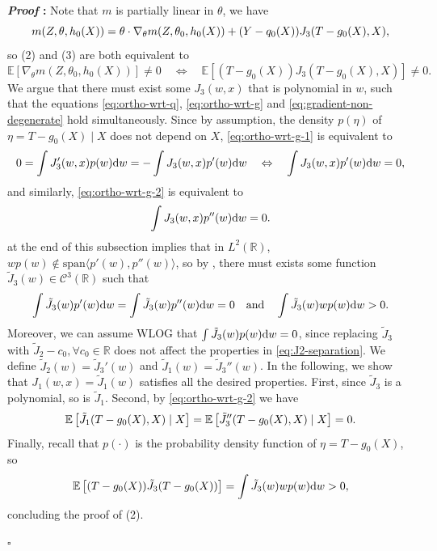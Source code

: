 \documentclass{article}
\def\gC{{\mathcal{C}}}
\newcommand{\E}{\mathbb{E}}
\newcommand{\R}{\mathbb{R}}
\newcommand{\dd}{\textup{d}}
\renewenvironment{proof}{\noindent\textbf{\textit{Proof }:}}{\hfill$\square$}
\begin{document}
\begin{proof}
Note that $m$ is partially linear in $\theta$, we have
\begin{equation}
    \notag
    m(Z,\theta,h_0(X)) = \theta\cdot\nabla_{\theta} m(Z,\theta_0,h_0(X)) + (Y-q_0(X))J_3(T-g_0(X),X),
\end{equation}
so (2) and (3) are both equivalent to
\begin{equation}
    \label{eq:gradient-non-degenerate}
    \E\left[ \nabla_{\theta} m(Z,\theta_0,h_0(X)) \right] \neq 0 \quad \Leftrightarrow \quad \E\left[ (T-g_0(X))J_3(T-g_0(X),X) \right] \neq 0.
\end{equation}
We argue that there must exist some $J_3(w,x)$ that is polynomial in $w$, such that the equations \eqref{eq:ortho-wrt-q}, \eqref{eq:ortho-wrt-g} and \eqref{eq:gradient-non-degenerate} hold simultaneously. Since by assumption, the density $p(\eta)$ of $\eta=T-g_0(X)\mid X$ does not depend on $X$, \eqref{eq:ortho-wrt-g-1} is equivalent to
\begin{equation}
    \notag
    0 = \int J_3'(w,x) p(w) \dd w = - \int J_3(w,x) p'(w) \dd w \quad \Leftrightarrow \quad \int J_3(w,x) p'(w) \dd w = 0,
\end{equation}
and similarly, \eqref{eq:ortho-wrt-g-2} is equivalent to
\begin{equation}
    \notag
    \int J_3(w,x) p''(w) \dd w = 0.
\end{equation}
  at the end of this subsection implies that in $L^2(\R)$, $wp(w)\notin\mathrm{span}\langle p'(w),p''(w)\rangle$, so by  , there must exists some function $\tilde{J}_3(w)\in\gC^3(\R)$ such that
\begin{equation}
    \label{eq:J2-separation}
    \int \tilde{J}_3(w) p'(w) \dd w = \int \tilde{J}_3(w) p''(w) \dd w = 0 \quad \text{and} \quad \int \tilde{J}_3(w)wp(w)\dd w  > 0.
\end{equation}
Moreover, we can assume WLOG that $\int \tilde{J}_3(w)p(w)\dd w = 0$, since replacing $\tilde{J}_3$ with $\tilde{J}_2-c_0, \forall c_0\in\R$ does not affect the properties in \eqref{eq:J2-separation}. We define $\tilde{J}_2(w)=\tilde{J}_3'(w)$ and $\tilde{J}_1(w)=\tilde{J}_3''(w)$. In the following, we show that $J_1(w,x)=\tilde{J}_1(w)$ satisfies all the desired properties. First, since $\tilde{J}_3$ is a polynomial, so is $\tilde{J}_1$. Second, by \eqref{eq:ortho-wrt-g-2} we have
\begin{equation}
    \notag
    \E\left[\tilde{J}_1(T-g_0(X),X)\mid X\right] = \E\left[\tilde{J}_3''(T-g_0(X),X)\mid X\right] = 0.
\end{equation}
Finally, recall that $p(\cdot)$ is the probability density function of $\eta=T-g_0(X)$, so 
\begin{equation}
    \notag
    \E\left[ (T-g_0(X))\tilde{J}_3(T-g_0(X)) \right] = \int \tilde{J}_3(w)wp(w)\dd w  > 0,
\end{equation}
concluding the proof of (2).


\end{proof}
\end{document}
